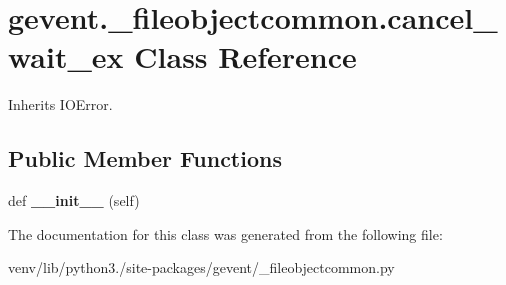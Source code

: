 \hypertarget{classgevent_1_1__fileobjectcommon_1_1cancel__wait__ex}{}\section{gevent.\+\_\+fileobjectcommon.\+cancel\+\_\+wait\+\_\+ex Class Reference}
\label{classgevent_1_1__fileobjectcommon_1_1cancel__wait__ex}


Inherits I\+O\+Error.

\subsection*{Public Member Functions}
\begin{DoxyCompactItemize}
\item 
\mbox{\label{classgevent_1_1__fileobjectcommon_1_1cancel__wait__ex_a78dfe8ee2cfff35f484b8cbe0384f40a}} 
def {\bfseries \+\_\+\+\_\+init\+\_\+\+\_\+} (self)
\end{DoxyCompactItemize}


The documentation for this class was generated from the following file\+:\begin{DoxyCompactItemize}
\item 
venv/lib/python3./site-\/packages/gevent/\+\_\+fileobjectcommon.\+py\end{DoxyCompactItemize}
